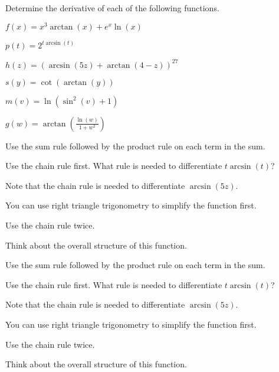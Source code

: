 \begin{activity} \label{A:2.6.3}   Determine the derivative of each of the following functions.
\ba
	  \item $\displaystyle f(x) = x^3 \arctan(x) + e^x \ln(x)$
           \item $\displaystyle p(t) = 2^{t\arcsin(t)}$
           \item $\displaystyle h(z) = (\arcsin(5z) + \arctan(4-z))^{27}$
  	  \item $\displaystyle s(y) = \cot(\arctan(y))$
  	  \item $\displaystyle m(v) = \ln(\sin^2(v)+1)$
  	 \item $\displaystyle g(w) = \arctan\left( \frac{\ln(w)}{1+w^2} \right)$
\ea
\end{activity}
\begin{smallhint}
\ba
	\item Use the sum rule followed by the product rule on each term in the sum.
	\item Use the chain rule first.  What rule is needed to differentiate $t\arcsin(t)$?
	\item Note that the chain rule is needed to differentiate $\arcsin(5z)$.
	\item You can use right triangle trigonometry to simplify the function first.
	\item Use the chain rule twice.
	\item Think about the overall structure of this function.
\ea
\end{smallhint}
\begin{bighint}
\ba
	\item Use the sum rule followed by the product rule on each term in the sum.
	\item Use the chain rule first.  What rule is needed to differentiate $t\arcsin(t)$?
	\item Note that the chain rule is needed to differentiate $\arcsin(5z)$.
	\item You can use right triangle trigonometry to simplify the function first.
	\item Use the chain rule twice.
	\item Think about the overall structure of this function.
\ea
\end{bighint}
